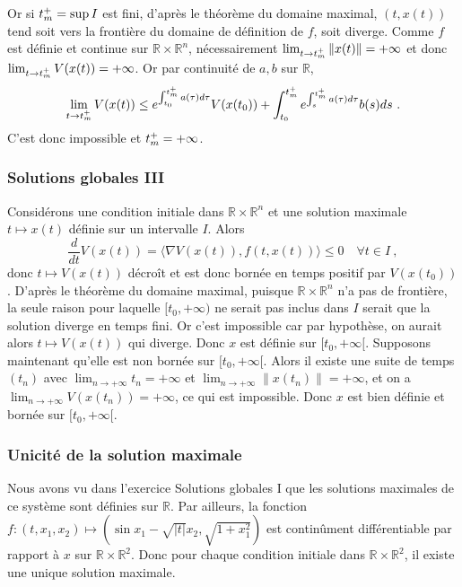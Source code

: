 Or si \(t_m^+= \sup I\) est fini, d'après le théorème du domaine
maximal, \((t,x(t))\) tend soit vers la frontière du domaine de
définition de \(f\), soit diverge. Comme \(f\) est définie et continue
sur \(\mathbb{R}\times \mathbb{R}^n\), nécessairement
\(\lim_{t\to t_m^+} \|x(t)\| = +\infty\) et donc
\(\lim_{t\to t_m^+} V(x(t)) = +\infty\). Or par continuité de \(a,b\)
sur \(\mathbb{R}\), \[
\lim_{t\to t_m^+} V(x(t)) \leq e^{\int_{t_0}^{t_m^+} a(\tau) d\tau} V(x(t_0)) + \int_{t_0}^{t_m^+} e^{\int_{s}^{t_m^+} a(\tau) d\tau} b(s) ds   \ .
\] C'est donc impossible et \(t_m^+= +\infty\).

\hypertarget{answer-glob_sol3}{%
\subsubsection*{Solutions globales III}\label{answer-glob_sol3}}


Considérons une condition initiale dans
\(\mathbb{R}\times \mathbb{R}^n\) et une solution maximale
\(t\mapsto x(t)\) définie sur un intervalle \(I\). Alors \[
\frac{d}{dt} V(x(t)) = \langle\nabla V (x(t)), f(t,x(t))\rangle \leq 0 \quad \forall t\in I \ ,
\] donc \(t\mapsto V(x(t))\) décroît et est donc bornée en temps positif
par \(V(x(t_0))\). D'après le théorème du domaine maximal, puisque
\(\mathbb{R}\times \mathbb{R}^n\) n'a pas de frontière, la seule raison
pour laquelle \([t_0,+\infty)\) ne serait pas inclus dans \(I\) serait
que la solution diverge en temps fini. Or c'est impossible car par
hypothèse, on aurait alors \(t\mapsto V(x(t))\) qui diverge. Donc \(x\)
est définie sur \([t_0,+\infty[\). Supposons maintenant qu'elle est non
bornée sur \([t_0,+\infty[\). Alors il existe une suite de temps \((t_n)\)
avec \(\lim_{n\to +\infty} t_n=+\infty\) et
\(\lim_{n\to +\infty} \|x(t_n)\|=+\infty\), et on a
\(\lim_{n\to +\infty} V(x(t_n))=+\infty\), ce qui est impossible. Donc
\(x\) est bien définie et bornée sur \([t_0,+\infty[\).

\hypertarget{answer-ini_sol}{%
\subsubsection*{Unicité de la solution maximale}\label{answer-ini_sol}}


Nous avons vu dans l'exercice Solutions globales I que les solutions
maximales de ce système sont définies sur \(\mathbb{R}\). Par ailleurs,
la fonction
\(f:(t,x_1,x_2)\mapsto (\sin x_1 - \sqrt{|t|} x_2 ,\sqrt{1+x_1^2})\) est
continûment différentiable par rapport à \(x\) sur
\(\mathbb{R}\times\mathbb{R}^2\). Donc pour chaque condition initiale
dans \(\mathbb{R}\times\mathbb{R}^2\), il existe une unique solution
maximale.

